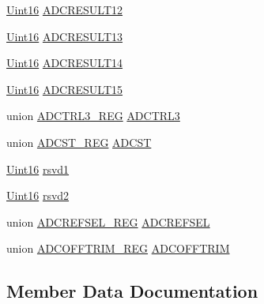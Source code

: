 \begin{DoxyCompactItemize}
\item 
\hyperlink{_d_s_p2833x___device_8h_a59a9f6be4562c327cbfb4f7e8e18f08b}{Uint16} \hyperlink{struct_a_d_c___r_e_g_s_aa4eea38a3a8ef072ca4ad8c0a062bca8}{A\+D\+C\+R\+E\+S\+U\+L\+T12}
\item 
\hyperlink{_d_s_p2833x___device_8h_a59a9f6be4562c327cbfb4f7e8e18f08b}{Uint16} \hyperlink{struct_a_d_c___r_e_g_s_af2d1688792675df97ad843fe0456cdd0}{A\+D\+C\+R\+E\+S\+U\+L\+T13}
\item 
\hyperlink{_d_s_p2833x___device_8h_a59a9f6be4562c327cbfb4f7e8e18f08b}{Uint16} \hyperlink{struct_a_d_c___r_e_g_s_a699c4f7480e90edf6a025ef02ae516c9}{A\+D\+C\+R\+E\+S\+U\+L\+T14}
\item 
\hyperlink{_d_s_p2833x___device_8h_a59a9f6be4562c327cbfb4f7e8e18f08b}{Uint16} \hyperlink{struct_a_d_c___r_e_g_s_ad60722dd296a993fda95e2a31f42389f}{A\+D\+C\+R\+E\+S\+U\+L\+T15}
\item 
union \hyperlink{union_a_d_c_t_r_l3___r_e_g}{A\+D\+C\+T\+R\+L3\+\_\+\+R\+E\+G} \hyperlink{struct_a_d_c___r_e_g_s_a1e2b7643d166321106f93eee9d244117}{A\+D\+C\+T\+R\+L3}
\item 
union \hyperlink{union_a_d_c_s_t___r_e_g}{A\+D\+C\+S\+T\+\_\+\+R\+E\+G} \hyperlink{struct_a_d_c___r_e_g_s_accfbdfaea8fb342f55c9d1bda4711aa2}{A\+D\+C\+S\+T}
\item 
\hyperlink{_d_s_p2833x___device_8h_a59a9f6be4562c327cbfb4f7e8e18f08b}{Uint16} \hyperlink{struct_a_d_c___r_e_g_s_a752ecdec5ca6ccef45074f406515fb3e}{rsvd1}
\item 
\hyperlink{_d_s_p2833x___device_8h_a59a9f6be4562c327cbfb4f7e8e18f08b}{Uint16} \hyperlink{struct_a_d_c___r_e_g_s_a395e4e2cbaaa2130c3e34d2fb71f13e0}{rsvd2}
\item 
union \hyperlink{union_a_d_c_r_e_f_s_e_l___r_e_g}{A\+D\+C\+R\+E\+F\+S\+E\+L\+\_\+\+R\+E\+G} \hyperlink{struct_a_d_c___r_e_g_s_a254a4c24dd7870e0c5880c98a0720b41}{A\+D\+C\+R\+E\+F\+S\+E\+L}
\item 
union \hyperlink{union_a_d_c_o_f_f_t_r_i_m___r_e_g}{A\+D\+C\+O\+F\+F\+T\+R\+I\+M\+\_\+\+R\+E\+G} \hyperlink{struct_a_d_c___r_e_g_s_ae8952dd63358d428fdd3bde422df99b2}{A\+D\+C\+O\+F\+F\+T\+R\+I\+M}
\end{DoxyCompactItemize}


\subsection{Member Data Documentation}
\hypertarget{struct_a_d_c___r_e_g_s_a0a3d114f1e0742f4c81e551dd1725d45}{}
